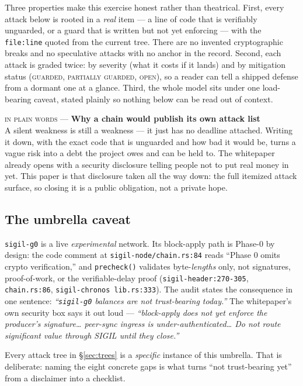 \documentclass[10pt,a4paper]{article}
\newcommand{\mgGuard}{{\scriptsize\textcolor{sigilcyan}{\textsc{guarded}}}}
\newcommand{\mgPartial}{{\scriptsize\textcolor{sigilviolet}{\textsc{partially guarded}}}}
\newcommand{\mgOpen}{{\scriptsize\textcolor{sigilamber}{\textsc{open}}}}
\newcommand{\layman}[3]{%
\begin{tcolorbox}[enhanced,
  interior style={left color=#1!9,right color=white},
  colframe=#1!45!slate,boxrule=0.5pt,arc=3pt,
  borderline west={2.5pt}{0pt}{#1},
  left=9pt,right=9pt,top=7pt,bottom=7pt]
{\scriptsize\textcolor{#1}{\textsc{in plain words}}\; — \;\textbf{\small #2}}\\[3pt]
\small #3
\end{tcolorbox}}
\begin{document}
Three properties make this exercise honest rather than theatrical. First, every attack
below is rooted in a \emph{real} item — a line of code that is verifiably unguarded, or a
guard that is written but not yet enforcing — with the \texttt{file:line} quoted from the
current tree. There are no invented cryptographic breaks and no speculative attacks with
no anchor in the record. Second, each attack is graded twice: by severity (what it costs
if it lands) and by mitigation status (\mgGuard{}, \mgPartial{}, \mgOpen{}), so a reader
can tell a shipped defense from a dormant one at a glance. Third, the whole model sits
under one load-bearing caveat, stated plainly so nothing below can be read out of context.

\layman{sigilviolet}{Why a chain would publish its own attack list}{A silent weakness is
still a weakness — it just has no deadline attached. Writing it down, with the exact code
that is unguarded and how bad it would be, turns a vague risk into a debt the project owes
and can be held to. The whitepaper already opens with a security disclosure telling people
not to put real money in yet. This paper is that disclosure taken all the way down: the
full itemized attack surface, so closing it is a public obligation, not a private hope.}

\subsection*{The umbrella caveat}

\texttt{sigil-g0} is a live \emph{experimental} network. Its block-apply path is Phase-0
by design: the code comment at \texttt{sigil-node/chain.rs:84} reads ``Phase 0 omits crypto
verification,'' and \texttt{precheck()} validates byte-\emph{lengths} only, not signatures,
proof-of-work, or the verifiable-delay proof (\texttt{sigil-header:270-305},
\texttt{chain.rs:86}, \texttt{sigil-chronos lib.rs:333}). The audit states the consequence
in one sentence: \emph{``\texttt{sigil-g0} balances are not trust-bearing today.''} The
whitepaper's own security box says it out loud — \emph{``block-apply does not yet enforce
the producer's signature\ldots{} peer-sync ingress is under-authenticated\ldots{} Do not
route significant value through SIGIL until they close.''}

Every attack tree in \S\ref{sec:trees} is a \emph{specific} instance of this umbrella.
That is deliberate: naming the eight concrete gaps is what turns ``not trust-bearing yet''
from a disclaimer into a checklist.
\end{document}

